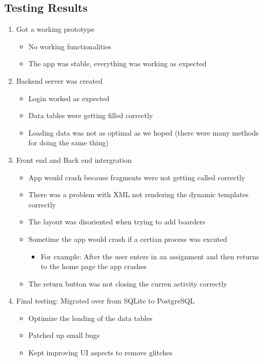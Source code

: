 \documentclass[a4paper]{article} %
\begin{document}
\subsection{Testing Results} \label{Testing Results}
\begin{enumerate}
  \item Got a working prototype
  \begin{itemize}
    \item No working functionalities
        \item The app was stable, everything was working as expected
  \end{itemize}
  \item Backend server was created
    \begin{itemize}
    \item Login worked as expected
        \item Data tables were getting filled correctly
        \item Loading data was not as optimal as we hoped (there were many methods for doing the same thing)
  \end{itemize}
    \item Front end and Back end intergration 
    \begin{itemize}
    \item App would crash because fragments were not getting called correctly
        \item There was a problem with XML not rendering the dynamic templates correctly
        \item The layout was disoriented when trying to add boarders
        \item Sometime the app would crash if a certian process was excuted
        \begin{itemize}
      \item For example: After the user enters in an assignment and then returns to the home page the app crashes
    \end{itemize}
        \item The return button was not closing the curren activity correctly
  \end{itemize}
    \item Final testing: Migrated over from SQLite to PostgreSQL
    \begin{itemize}
      \item Optimize the loading of the data tables
        \item Patched up small bugs
        \item Kept improving UI aspects to remove glitches
    \end{itemize}
\end{enumerate}
\end{document}
